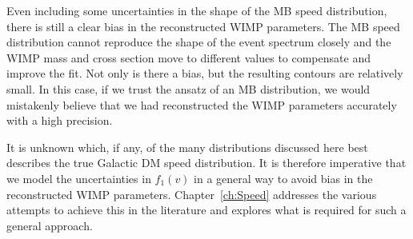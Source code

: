 Even including some uncertainties in the shape of the MB speed distribution, there is still a clear bias in the reconstructed WIMP parameters. The MB speed distribution cannot reproduce the shape of the event spectrum closely and the WIMP mass and cross section move to different values to compensate and improve the fit. Not only is there a bias, but the resulting contours are relatively small. In this case, if we trust the ansatz of an MB distribution, we would mistakenly believe that we had reconstructed the WIMP parameters accurately with a high precision.

It is unknown which, if any, of the many distributions discussed here best describes the true Galactic DM speed distribution. It is therefore imperative that we model the uncertainties in $f_1(v)$ in a general way to avoid bias in the reconstructed WIMP parameters. Chapter~\ref{ch:Speed} addresses the various attempts to achieve this in the literature and explores what is required for such a general approach.


